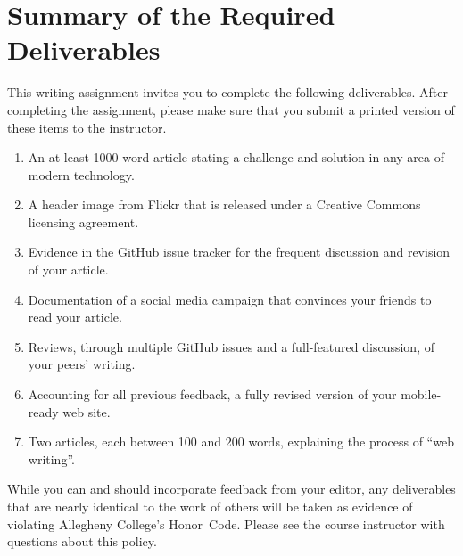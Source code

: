 \section*{Summary of the Required Deliverables}

This writing assignment invites you to complete the following deliverables. After completing the assignment, please make
sure that you submit a printed version of these items to the instructor.

\vspace*{-.1in}
\begin{enumerate}
  \setlength{\itemsep}{-.01in}

  \item An at least 1000 word article stating a challenge and solution in any area of modern technology.
  \item A header image from Flickr that is released under a Creative Commons licensing agreement.
  \item Evidence in the GitHub issue tracker for the frequent discussion and revision of your article.
  \item Documentation of a social media campaign that convinces your friends to read your article.
  \item Reviews, through multiple GitHub issues and a full-featured discussion, of your peers' writing.
  \item Accounting for all previous feedback, a fully revised version of your mobile-ready web site.
  \item Two articles, each between 100 and 200 words, explaining the process of ``web writing''.
\end{enumerate}
\vspace*{-.1in}


While you can and should incorporate feedback from your editor, any deliverables that are nearly identical to the work
of others will be taken as evidence of violating Allegheny College's \mbox{Honor Code}. Please see the course instructor
with questions about this policy.



